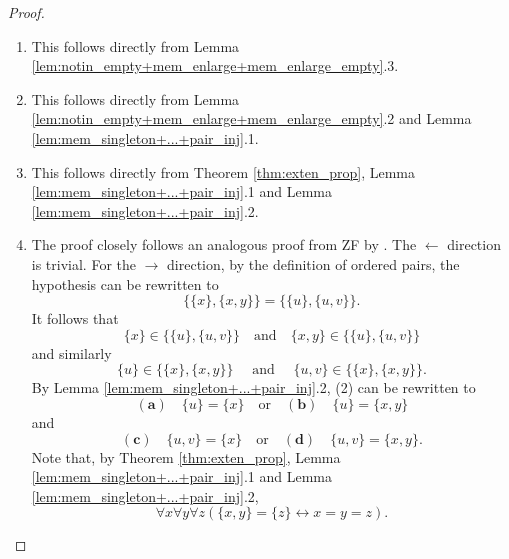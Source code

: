 \begin{proof}
    \leanok
    \leavevmode
    \begin{enumerate}
        \item This follows directly from Lemma 
        \ref{lem:notin_empty+mem_enlarge+mem_enlarge_empty}.3.
        \item This follows directly from 
        Lemma \ref{lem:notin_empty+mem_enlarge+mem_enlarge_empty}.2 and 
        Lemma \ref{lem:mem_singleton+...+pair_inj}.1.
        \item This follows directly from Theorem \ref{thm:exten_prop},
        Lemma \ref{lem:mem_singleton+...+pair_inj}.1 and 
        Lemma \ref{lem:mem_singleton+...+pair_inj}.2.
        \item  The proof closely follows an analogous proof from ZF by \cite{enderton1977elements}.
        The $\leftarrow$ direction is trivial.
        For the $\rightarrow$ direction, by the definition of ordered pairs, 
        the hypothesis can be rewritten to
        \begin{equation*}
            \{\{x\}, \{x,y\}\} = \{\{u\}, \{u,v\}\}.
        \end{equation*}
        It follows that
        \begin{equation}
            \{x\} \in \{\{u\}, \{u,v\}\}\quad\text{and}\quad \{x,y\} \in \{\{u\}, \{u,v\}\}
        \end{equation}
        and similarly
        \begin{equation}
            \{u\} \in \{\{x\}, \{x,y\}\}\quad\text{ and }\quad \{u,v\} \in \{\{x\}, \{x,y\}\}.
        \end{equation}
        By Lemma \ref{lem:mem_singleton+...+pair_inj}.2, (2) can be rewritten to
        \begin{equation*}
            (\textbf{a})\quad\{u\}=\{x\}\quad\text{or}\quad (\textbf{b})\quad\{u\}=\{x,y\}
        \end{equation*}
        and
        \begin{equation*}
            (\textbf{c})\quad\{u,v\}=\{x\}\quad\text{or}\quad (\textbf{d})\quad\{u,v\}=\{x,y\}.
        \end{equation*}
        Note that, by Theorem \ref{thm:exten_prop}, Lemma \ref{lem:mem_singleton+...+pair_inj}.1 
        and Lemma \ref{lem:mem_singleton+...+pair_inj}.2,
        \begin{equation}
        \forall x \forall y \forall z (\{x,y\} = \{z\} \leftrightarrow x = y =z).
        \end{equation}

\end{enumerate}
\end{proof}
